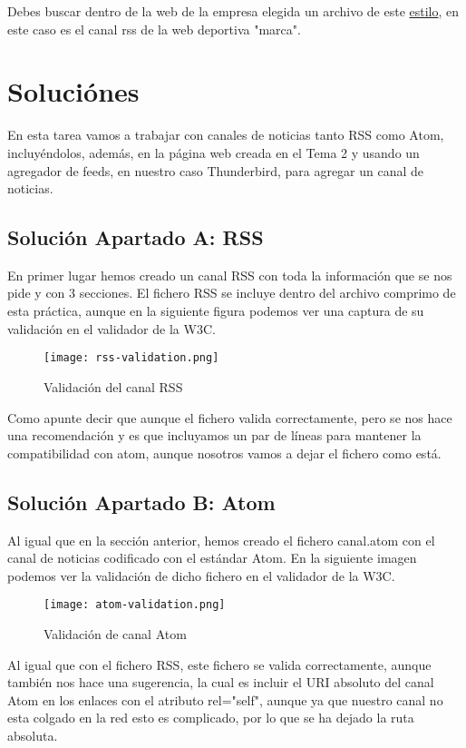 Debes buscar dentro de la web de la empresa elegida un archivo de este \href{https://e00-marca.uecdn.es/rss/portada.xml}{estilo}, en este caso es el canal rss de la web deportiva "marca".

\section{Soluciónes}
En esta tarea vamos a trabajar con canales de noticias tanto RSS como Atom, incluyéndolos, además, en la página web creada en el Tema 2 y usando un agregador de feeds, en nuestro caso Thunderbird, para agregar un canal de noticias.

\subsection{Solución Apartado A: RSS}

En primer lugar hemos creado un canal RSS con toda la información que se nos pide y con 3 secciones. El fichero RSS se incluye dentro del archivo comprimo de esta práctica, aunque en la siguiente figura podemos ver una captura de su validación en el validador de la W3C.

\begin{figure}[H]
    \centering
    \texttt{[image: rss-validation.png]}
    \caption{Validación del canal RSS}
\end{figure}

Como apunte decir que aunque el fichero valida correctamente, pero se nos hace una recomendación y es que incluyamos un par de líneas para mantener la compatibilidad con atom, aunque nosotros vamos a dejar el fichero como está.

\subsection{Solución Apartado B: Atom}
Al igual que en la sección anterior, hemos creado el fichero canal.atom con el canal de noticias codificado con el estándar Atom. En la siguiente imagen podemos ver la validación de dicho fichero en el validador de la W3C.

\begin{figure}[H]
    \centering
    \texttt{[image: atom-validation.png]}
    \caption{Validación de canal Atom}
\end{figure}

Al igual que con el fichero RSS, este fichero se valida correctamente, aunque también nos hace una sugerencia, la cual es incluir el URI absoluto del canal Atom en los enlaces con el atributo rel="self", aunque ya que nuestro canal no esta colgado en la red esto es complicado, por lo que se ha dejado la ruta absoluta.

